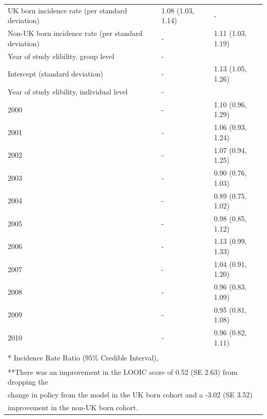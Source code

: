 \documentclass[11pt,twoside]{bristolthesis}
\begin{document}
\begin{table}[!h]
\begin{tabular}{lll}
  UK born incidence rate (per standard deviation) & 1.08 (1.03, 1.14) & -\\
  Non-UK born incidence rate (per standard deviation) & - & 1.11 (1.03, 1.19)\\
  Year of study elibility, group level & - & \\
  \hspace{1em}Intercept (standard deviation) & - & 1.13 (1.05, 1.26)\\
  Year of study elibility, individual level & - & \\
  \addlinespace
  \hspace{1em}2000 & - & 1.10 (0.96, 1.29)\\
  \hspace{1em}2001 & - & 1.06 (0.93, 1.24)\\
  \hspace{1em}2002 & - & 1.07 (0.94, 1.25)\\
  \hspace{1em}2003 & - & 0.90 (0.76, 1.03)\\
  \hspace{1em}2004 & - & 0.89 (0.75, 1.02)\\
  \addlinespace
  \hspace{1em}2005 & - & 0.98 (0.85, 1.12)\\
  \hspace{1em}2006 & - & 1.13 (0.99, 1.33)\\
  \hspace{1em}2007 & - & 1.04 (0.91, 1.20)\\
  \hspace{1em}2008 & - & 0.96 (0.83, 1.09)\\
  \hspace{1em}2009 & - & 0.95 (0.81, 1.08)\\
  \addlinespace
  \hspace{1em}2010 & - & 0.96 (0.82, 1.11)\\
  \bottomrule
  \multicolumn{3}{l}{\textsuperscript{} * Incidence Rate Ratio (95\% Credible Interval),}\\
  \multicolumn{3}{l}{\textsuperscript{} **There was an improvement in the LOOIC score of 0.52 (SE 2.63) from dropping the}\\
  \multicolumn{3}{l}{change in policy from the model in the UK born cohort and a -3.02 (SE 3.52)}\\
  \multicolumn{3}{l}{improvement in the non-UK born cohort.}\\
  \end{tabular}
  \end{table}
\end{document}
